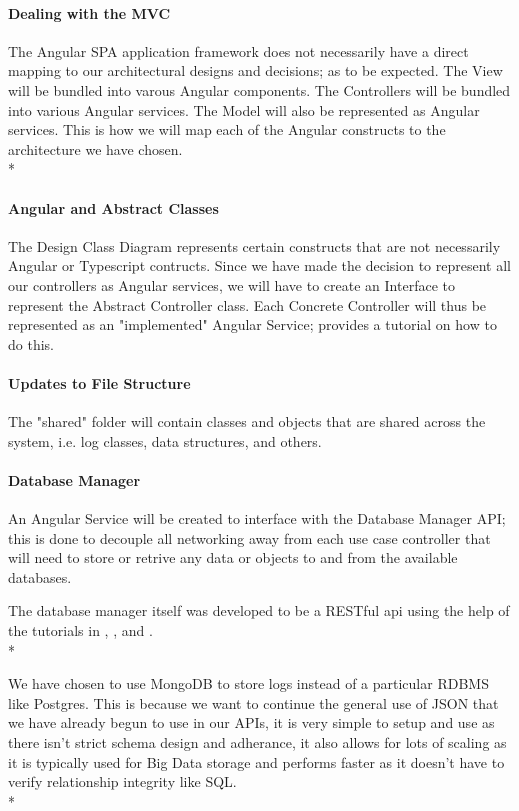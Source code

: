 \documentclass[11pt]{article}
\begin{document}

\paragraph{Dealing with the MVC}
The Angular SPA application framework does not necessarily have a direct mapping to our architectural designs and decisions; as to be expected. The View will be bundled into varous Angular components. The Controllers will be bundled into various Angular services. The Model will also be represented as Angular services. This is how we will map each of the Angular constructs to the architecture we have chosen.\\*

\paragraph{Angular and Abstract Classes}
The Design Class Diagram represents certain constructs that are not necessarily Angular or Typescript contructs. Since we have made the decision to represent all our controllers as Angular services, we will have to create an Interface to represent the Abstract Controller class. Each Concrete Controller will thus be represented as an "implemented" Angular Service; \cite{Website:5} provides a tutorial on how to do this.

\paragraph{Updates to File Structure}
The "shared" folder will contain classes and objects  that are shared across the system, i.e. log classes, data structures, and others.\par

\paragraph{Database Manager}
An Angular Service will be created to interface with the Database Manager API; this is done to decouple all networking away from each use case controller that will need to store or retrive any data or objects to and from the available databases.\par
The database manager itself was developed to be a RESTful api using the help of the tutorials in \cite{Website:6}, \cite{Website:7}, and \cite{Website:8}.\\*

We have chosen to use MongoDB to store logs instead of a particular RDBMS like Postgres. This is because we want to continue the general use of JSON that we have already begun to use in our APIs, it is very simple to setup and use\cite{Website:10} as there isn't strict schema design and adherance\cite{Website:11}, it also allows for lots of scaling\cite{Website:10} as it is typically used for Big Data storage\cite{Website:12} and performs faster as it doesn't have to verify relationship integrity like SQL\cite{Website:11}.\\*
\end{document}
